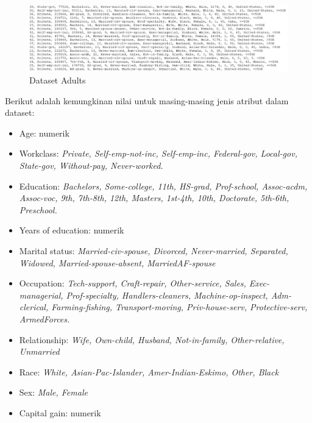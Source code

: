 \documentclass[a4paper,twoside]{article}
\begin{document}
\begin{enumerate}
\begin{figure}[H]
	\centering
	\includegraphics[scale=0.47]{dataset1}
	\caption{Dataset Adults}
	\label{fig:dataset1}
\end{figure}

\noindent Berikut adalah kemungkinan nilai untuk masing-masing jenis atribut dalam dataset:

\begin{itemize}
\item Age: numerik

\item Workclass: \textit{Private, Self-emp-not-inc, Self-emp-inc, Federal-gov, Local-gov, State-gov, Without-pay, Never-worked.}

\item Education: \textit{Bachelors, Some-college, 11th, HS-grad, Prof-school, Assoc-acdm, Assoc-voc, 9th, 7th-8th, 12th, Masters, 1st-4th, 10th, Doctorate, 5th-6th, Preschool.}

\item Years of education: numerik

\item Marital status: 
\textit{Married-civ-spouse, Divorced, Never-married, Separated, Widowed, Married-spouse-absent, MarriedAF-spouse}

\item Occupation: \textit{Tech-support, Craft-repair, Other-service, Sales, Exec-managerial, Prof-specialty, Handlers-cleaners, Machine-op-inspect, Adm-clerical, Farming-fishing, Transport-moving, Priv-house-serv, Protective-serv, ArmedForces.}

\item Relationship: \textit{Wife, Own-child, Husband, Not-in-family, Other-relative, Unmarried}

\item Race: \textit{White, Asian-Pac-Islander, Amer-Indian-Eskimo, Other, Black}

\item Sex: \textit{Male, Female}

\item Capital gain: numerik


\end{itemize}
\end{enumerate}
\end{document}
